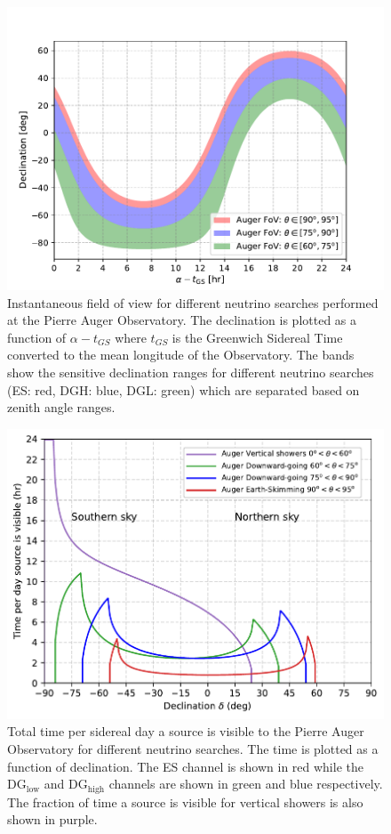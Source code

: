 \begin{figure}[t!]
  \centering
  \includegraphics[width=14.5cm]{thesis_figures/PointLimits/Auger_FoV_1.pdf}
  \caption{Instantaneous field of view for different neutrino searches performed at the Pierre Auger Observatory. The declination is plotted as a function of $\alpha - t_{GS}$ where $t_{GS}$ is the Greenwich Sidereal Time converted to the mean longitude of the Observatory. The bands show the sensitive declination ranges for different neutrino searches (ES: red, DGH: blue, DGL: green) which are separated based on zenith angle ranges.}
  \label{fig:Auger_FoV}
\end{figure}

\begin{figure}[t!]
  \centering
  \includegraphics[width=14.5cm]{thesis_figures/PointLimits/Time_per_day.pdf}
  \caption{Total time per sidereal day a source is visible to the Pierre Auger Observatory for different neutrino searches. The time is plotted as a function of declination. The ES channel is shown in red while the DG$\mathrm{_{\text{low}}}$ and DG$\mathrm{_{\text{high}}}$ channels are shown in green and blue respectively. The fraction of time a source is visible for vertical showers is also shown in purple.}
  \label{fig:time_per_day}
\end{figure}

